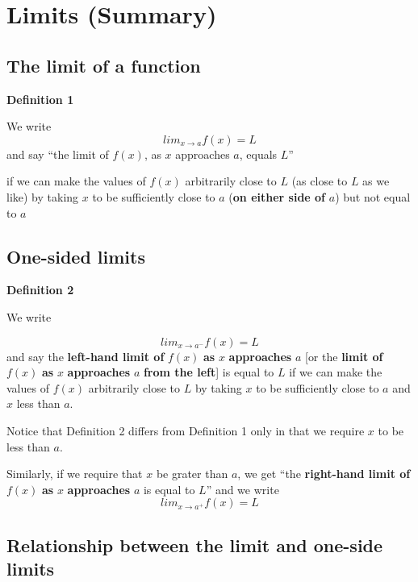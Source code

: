 \documentclass[]{book}
\begin{document}

\hypertarget{limits-summary}{%
\section*{Limits (Summary)}\label{limits-summary}}

\hypertarget{the-limit-of-a-function}{%
\subsection*{The limit of a function}\label{the-limit-of-a-function}}

\textbf{Definition 1}

We write \[lim_{x\to a}f(x)=L\] and say ``the limit of \(f(x)\), as \(x\) approaches \(a\), equals \(L\)''

if we can make the values of \(f(x)\) arbitrarily close to \(L\) (as close to \(L\) as we like) by taking \(x\) to be sufficiently close to \(a\) (\textbf{on either side of} \(a\)) but not equal to \(a\)

\hypertarget{one-sided-limits}{%
\subsection*{One-sided limits}\label{one-sided-limits}}

\textbf{Definition 2}

We write

\[lim_{x\to a^-}f(x)=L\]
and say the \textbf{left-hand limit of} \(f(x)\) \textbf{as} \(x\) \textbf{approaches} \(a\) {[}or the \textbf{limit of} \(f(x)\) \textbf{as} \(x\) \textbf{approaches} \(a\) \textbf{from the left}{]} is equal to \(L\) if we can make the values of \(f(x)\) arbitrarily close to \(L\) by taking \(x\) to be sufficiently close to \(a\) and \(x\) less than \(a\).

Notice that Definition 2 differs from Definition 1 only in that we require \(x\) to be less than \(a\).

Similarly, if we require that \(x\) be grater than \(a\), we get ``the \textbf{right-hand limit of} \(f(x)\) \textbf{as} \(x\) \textbf{approaches} \(a\) is equal to \(L\)'' and we write
\[lim_{x\to a^+}f(x)=L\]

\hypertarget{relationship-between-the-limit-and-one-side-limits}{%
\subsection{Relationship between the limit and one-side limits}\label{relationship-between-the-limit-and-one-side-limits}}
\end{document}
